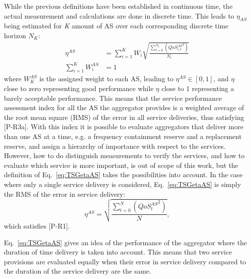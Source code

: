 While the previous definitions have been established in continuous time, the actual measurement and calculations are done in discrete time. This leads to $\eta_{AS}$ being estimated for \emph{K} amount of AS over each corresponding discrete time horizon $N_K$:
\begin{align}\label{eq:TSGetaAS}
\eta^{AS} &= \sum^{K}_{i=1} W_i \sqrt{\frac{\sum^{N_i}_{t=0} \left( {QoS^{AS}_{i,t}}^{2} \right)}{N_i}}\\
\sum_{i=1}^K W^{AS}_i &= 1
\end{align}
where $W^{AS}_K$ is the assigned weight to each AS, leading to $\eta^{AS} \in [0,1]$, and $\eta$ close to zero representing good performance while $\eta$ close to 1 representing a barely acceptable performance. This means that the service performance assessment index for all the AS the aggregator provides is a weighted average of the root mean square (RMS) of the error in all service deliveries, thus satisfying [P-R3a]. With this index it is possible to evaluate aggregators that deliver more than one AS at a time, e.g. a frequency containment reserve and a replacement reserve, and assign a hierarchy of importance with respect to the services. However, how to do distinguish measurements to verify the services, and how to evaluate which service is more important, is out of scope of this work, but the definition of Eq.~\eqref{eq:TSGetaAS} takes the possibilities into account. In the case where only a single service delivery is considered, Eq.~\eqref{eq:TSGetaAS} is simply the RMS of the error in service delivery:
\begin{equation}\label{eq:etaASsimp}
\eta^{AS} = \sqrt{\frac{\sum^{N}_{t=0} \left( {QoS^{AS}_{t}}^{2} \right)}{N}},
\end{equation}
which satisfies [P-R1]. 

Eq.~\eqref{eq:TSGetaAS} gives an idea of the performance of the aggregator where the duration of time delivery is taken into account. This means that two service provisions are evaluated equally when their error in service delivery compared to the duration of the service delivery are the same. %


